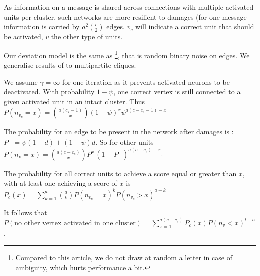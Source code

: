 \documentclass[english,11pt,twocolumn]{article}
\renewcommand{\ge}{\geqslant}
\theoremstyle{definition}
\begin{document}
	As information on a message is shared across connections with multiple activated units per cluster, such networks are more resilient to damages (for one message information is carried by $a^2 {c \choose 2}$ edges. $v_c$ will indicate a correct unit that should be activated, $v$ the other type of units.
	
	Our deviation model is the same as \cite{LedGriRabGro20145}\footnote{Compared to this article, we do not draw at random a letter in case of ambiguity, which hurts performance a bit.}, that is random binary noise on edges. We generalise results of \cite{LedGriRabGro20145} to multipartite cliques.
	
	We assume $\gamma = \infty$ for one iteration as it prevents activated neurons to be deactivated.
	With probability $1 - \psi$, one correct vertex is still connected to a given activated unit in an intact cluster. Thus $P(n_{v_c} = x ) = {a (c_k-1) \choose x} (1-\psi)^{x} \psi ^ { a (c - c_e -1) - x }$	
	
	
	The probability for an edge to be present in the network after damages is : $P_+ = \psi (1 - d) + (1 - \psi) d$. So for other units $P(n_v = x) = {a (c - c_e) \choose x} P_+^x (1-P_+)^{a (c - c_e) -x }$.
	
%	
	
	
	The probability for all correct units to achieve a score equal or greater than $x$, with at least one achieving a score of $x$ is $P_c (x) =\sum_{k = 1}^{a} { a \choose k }   P(n_{v_c} = x)^k P(n_{v_c} > x)^{a-k} $

	It follows that $P(\mbox{no other vertex activated in one cluster})= \sum_{x = 1}^{a (c - c_e)} P_c(x) P(n_v < x)^{l-a}$.%
	
\end{document}
